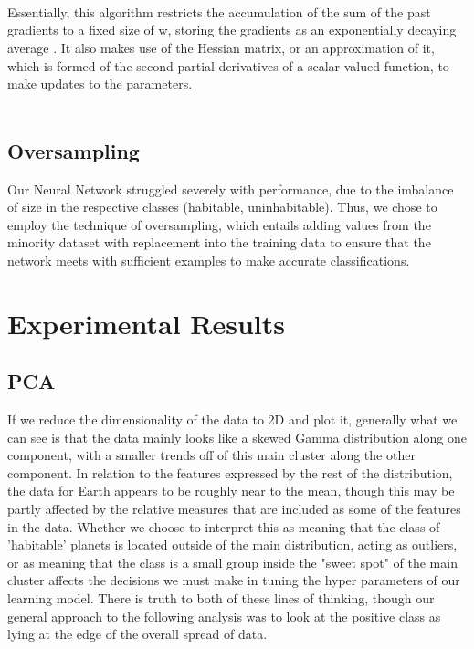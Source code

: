 \documentclass[11.5pt]{article}
\begin{document}
\\
\\
\\
Essentially, this algorithm restricts the accumulation of the sum of the past gradients to a fixed size of w, storing the gradients as an exponentially decaying average \cite{Zeiler}. It also makes use of the Hessian matrix, or an approximation of it, which is formed of the second partial derivatives of a scalar valued function, to make updates to the parameters.
\\
\\
\subsection{Oversampling}
Our Neural Network struggled severely with performance, due to the imbalance of size in the respective classes (habitable, uninhabitable). Thus, we chose to employ the technique of oversampling, which entails adding values from the minority dataset with replacement into the training data to ensure that the network meets with sufficient examples to make accurate classifications.  \cite{Mohammed} 

\section{Experimental Results}

\subsection{PCA}
If we reduce the dimensionality of the data to 2D and plot it, generally what we can see is that the data mainly looks like a skewed Gamma distribution along one component, with a smaller trends off of this main cluster along the other component.
In relation to the features expressed by the rest of the distribution, the data for Earth appears to be roughly near to the mean, though this may be partly affected by the relative measures that are included as some of the features in the data. Whether we choose to interpret this as meaning that the class of 'habitable' planets is located outside of the main distribution, acting as outliers, or as meaning that the class is a small group inside the "sweet spot" of the main cluster affects the decisions we must make in tuning the hyper parameters of our learning model. There is truth to both of these lines of thinking, though our general approach to the following analysis was to look at the positive class as lying at the edge of the overall spread of data.
\end{document}
